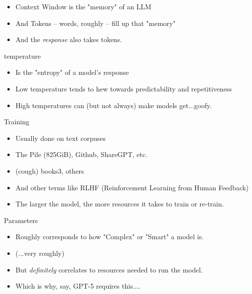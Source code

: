 \documentclass{beamer}
\begin{document}
\begin{frame}
	\begin{itemize}
		\item Context Window is the "memory" of an LLM
		\pause
		\item And Tokens -- words, roughly -- fill up that "memory"
		\pause
		\item And the \textit{response} also takes tokens.
	\end{itemize}
\end{frame}


\begin{frame}[plain]
\end{frame}

\begin{frame}{temperature}
	\begin{itemize}
		\item Is the "entropy" of a model's response
		\pause
		\item Low temperature tends to hew towards predictability and repetitiveness
		\pause
		\item High temperatures can (but not always) make models get...goofy. 
	\end{itemize}
\end{frame}

\begin{frame}{Training}
	\begin{itemize}
		\item Usually done on text corpuses
		\pause
		\item The Pile (825GiB), Github, ShareGPT, etc.
		\pause
		\item (cough) books3, others
		\pause
		\item And other terms like RLHF (Reinforcement Learning from Human Feedback)
		\pause
		\item The larger the model, the more resources it takes to train or re-train.
	\end{itemize}
\end{frame}

\begin{frame}{Parameters}
	\begin{itemize}
		\item Roughly corresponds to how "Complex" or "Smart" a model is.
		\pause
		\item (...very roughly)
		\pause 
		\item But \textit{definitely} correlates to resources needed to run the model.
		\pause
		\item Which is why, say, GPT-5 requires this....
	\end{itemize}
\end{frame}
\end{document}
